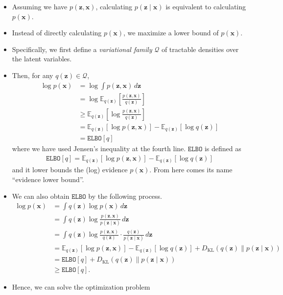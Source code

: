 \documentclass[10pt]{article}
\newcommand{\EE}{\mathbb{E}}
\newcommand{\QQ}{\mathcal{Q}}
\newcommand{\elbo}{\texttt{ELBO}}
\newcommand{\KL}{D_{\text{KL}}}
\begin{document}
\begin{itemize}
\item Assuming we have $p(\bm{z},\bm{x})$, calculating $p(\bm{z} \mid \bm{x})$ is equivalent to calculating $p(\bm{x})$.
\item Instead of directly calculating $p(\bm{x})$, we maximize a lower bound of $p(\bm{x})$.
\item Specifically, we first define a \textit{variational family} $\QQ$ of tractable densities over the latent variables.
\item Then, for any $q(\bm{z}) \in \QQ$,
\begin{align*}
\log p(\bm{x}) &= \log \int p(\bm{z},\bm{x}) \, d\bm{z} \\
&= \log \EE_{q(\bm{z})} \left[ \frac{p(\bm{z},\bm{x})}{q(\bm{z})} \right] \\
&\geq \EE_{q(\bm{z})} \left[ \log \frac{p(\bm{z},\bm{x})}{q(\bm{z})} \right] \\
&= \EE_{q(\bm{z})} [ \log p(\bm{z},\bm{x}) ] - \EE_{q(\bm{z})} [\log q(\bm{z})] \\
&= \elbo[q]
\end{align*}
where we have used Jensen's inequality at the fourth line. $\elbo$ is defined as
\begin{align} \label{eq:elbo1}
\elbo[q] = \EE_{q(\bm{z})} [ \log p(\bm{z},\bm{x}) ] - \EE_{q(\bm{z})} [\log q(\bm{z})]
\end{align}
and it lower bounds the (log) evidence $p(\bm{x})$. From here comes its name \enquote{evidence lower bound}.
\item We can also obtain $\elbo$ by the following process.
\begin{align} \label{eq:elbomax}
\log p(\bm{x}) &= \int q(\bm{z}) \log p(\bm{x}) \, d\bm{z} \nonumber \\
&= \int q(\bm{z}) \log \frac{p(\bm{z},\bm{x})}{p(\bm{z} \mid \bm{x})} \, d\bm{z} \nonumber \\
&= \int q(\bm{z}) \log \frac{p(\bm{z},\bm{x})}{q(\bm{z})} \cdot \frac{q(\bm{z})}{p(\bm{z} \mid \bm{x})} \, d\bm{z} \nonumber \\
&= \EE_{q(\bm{z})} [ \log p(\bm{z},\bm{x}) ] - \EE_{q(\bm{z})} [\log q(\bm{z})] + \KL(q(\bm{z}) \| p(\bm{z} \mid \bm{x})) \nonumber \\
&= \elbo[q] + \KL(q(\bm{z}) \| p(\bm{z} \mid \bm{x})) \\
&\geq \elbo[q]. \nonumber
\end{align}
\item Hence, we can solve the optimization problem

\end{itemize}
\end{document}
